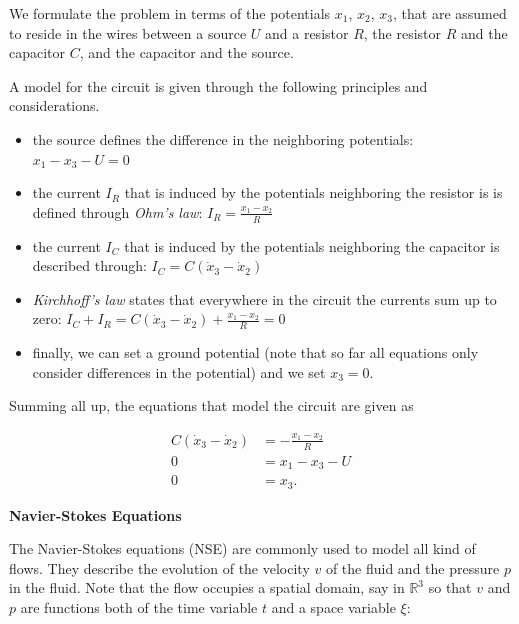 \documentclass[]{book}
\providecommand{\tightlist}{%
  \setlength{\itemsep}{0pt}\setlength{\parskip}{0pt}}
\theoremstyle{definition}
\theoremstyle{definition}
\theoremstyle{definition}
\theoremstyle{remark}
\let\BeginKnitrBlock\begin \let\EndKnitrBlock\end
\begin{document}
We formulate the problem in terms of the potentials \(x_1\), \(x_2\),
\(x_3\), that are assumed to reside in the wires between a source \(U\)
and a resistor \(R\), the resistor \(R\) and the capacitor \(C\), and
the capacitor and the source.

A model for the circuit is given through the following principles and
considerations.

\begin{itemize}
\tightlist
\item
  the source defines the difference in the neighboring potentials:
  \(x_1 - x_3 - U = 0\)
\item
  the current \(I_R\) that is induced by the potentials neighboring the
  resistor is is defined through \emph{Ohm's law}:
  \(I_R = \frac{x_1 - x_2}{R}\)
\item
  the current \(I_C\) that is induced by the potentials neighboring the
  capacitor is described through: \(I_C = C(\dot x_3 - \dot x_2)\)
\item
  \emph{Kirchhoff's law} states that everywhere in the circuit the
  currents sum up to zero:
  \(I_C + I_R = C(\dot x_3 - \dot x_2)+ \frac{x_1 - x_2}{R}=0\)
\item
  finally, we can set a ground potential (note that so far all equations
  only consider differences in the potential) and we set \(x_3 = 0\).
\end{itemize}

\BeginKnitrBlock{example}
\protect\hypertarget{exm:the-circuit}{}{\label{exm:the-circuit} }Summing all
up, the equations that model the circuit are given as

\begin{equation}
\begin{split}
C(\dot x_3 - \dot x_2) &= - \frac{x_1 - x_2}{R} \\
0  &= x_1 - x_3 - U \\
0 &= x_3. 
\end{split}
\label{eq:circuit}
\end{equation}
\EndKnitrBlock{example}

\textbf{Navier-Stokes Equations}

The Navier-Stokes equations (NSE) are commonly used to model all kind of
flows. They describe the evolution of the velocity \(v\) of the fluid
and the pressure \(p\) in the fluid. Note that the flow occupies a
spatial domain, say in \(\mathbb R^{3}\) so that \(v\) and \(p\) are
functions both of the time variable \(t\) and a space variable \(\xi\):
\end{document}
